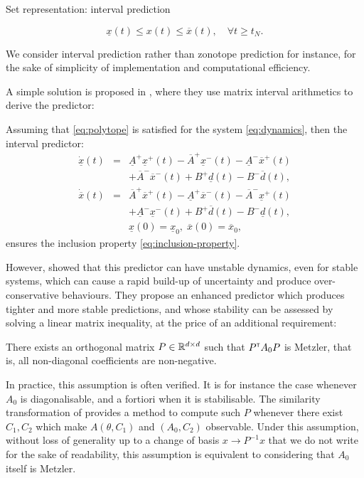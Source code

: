 \documentclass{article}
\begin{document}
\label{sec:prediction}

Set representation: interval prediction

\begin{equation}
\label{eq:inclusion-property}
\underline{x}(t)\leq x(t)\leq\overline{x}(t),\quad\forall t\geq t_N.
\end{equation}

We consider interval prediction rather than zonotope prediction for instance, for the sake of simplicity of implementation and computational efficiency. 

A simple solution is proposed in \citep{efimov:hal-00701643}, where they use matrix interval arithmetics to derive the predictor:
\begin{proposition}
Assuming that \eqref{eq:polytope} is satisfied for the system \eqref{eq:dynamics}, then the interval predictor:
\begin{eqnarray}
\dot{\underline{x}}(t) & = & \underline{A}^{+}\underline{x}^{+}(t)-\overline{A}^{+}\underline{x}^{-}(t)-\underline{A}^{-}\overline{x}^{+}(t)\nonumber \\
 &  & +\overline{A}^{-}\overline{x}^{-}(t)+B^{+}\underline{d}(t)-B^{-}\overline{d}(t),\label{eq:IP_direct}\\
\dot{\overline{x}}(t) & = & \overline{A}^{+}\overline{x}^{+}(t)-\underline{A}^{+}\overline{x}^{-}(t)-\overline{A}^{-}\underline{x}^{+}(t)\nonumber \\
 &  & +\underline{A}^{-}\underline{x}^{-}(t)+B^{+}\overline{d}(t)-B^{-}\underline{d}(t),\nonumber \\
 &  & \underline{x}(0)=\underline{x}_{0},\;\overline{x}(0)=\overline{x}_{0},\nonumber 
\end{eqnarray}
ensures the inclusion property \eqref{eq:inclusion-property}.
\end{proposition}

However, \citet{leurent2019interval} showed that this predictor can have unstable dynamics, even for stable systems, which can cause a rapid build-up of uncertainty and produce over-conservative behaviours. They propose an enhanced predictor which produces tighter and more stable predictions, and whose stability can be assessed by solving a linear matrix inequality, at the price of an additional requirement:

\begin{assumption}
\label{assumpt:metzler}
There exists an orthogonal matrix $P\in\mathbb{R}^{d\times d}$ such that $P^{\mathsf{\scriptscriptstyle T}} A_0 P$ is Metzler, that is, all non-diagonal coefficients are non-negative.
\end{assumption}
In practice, this assumption is often verified. It is for instance the case whenever $A_0$ is diagonalisable, and a fortiori when it is stabilisable. The similarity transformation of \citep{Efimov_a2013} provides a method to compute such $P$ whenever there exist $C_1,C_2$ which make $A(\theta, C_1)$ and $(A_0, C_2)$ observable.
Under this assumption, without loss of generality up to a change of basis $x\rightarrow P^{-1}x$ that we do not write for the sake of readability, this assumption is equivalent to considering that $A_0$ itself is Metzler.
\end{document}
